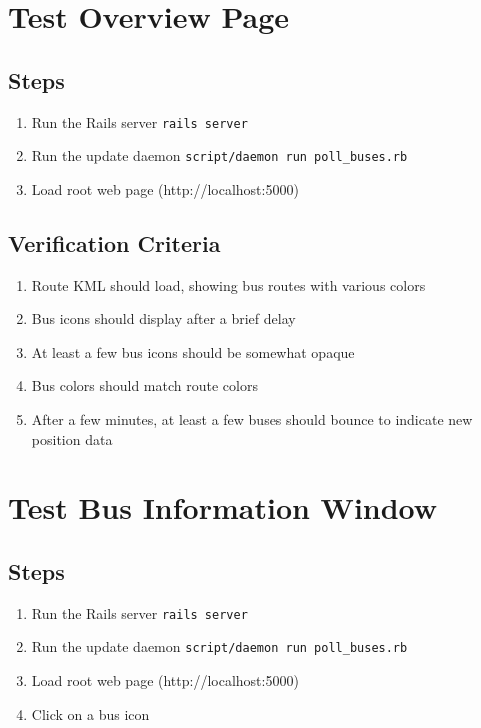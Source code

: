 \documentclass[12pt]{report}
\newcommand{\lstBash}{\lstinline[language=bash,breaklines=true]}
\begin{document}
\section{Test Overview Page}
\subsection*{Steps}
\begin{enumerate}
\item Run the Rails server \lstBash|rails server|
\item Run the update daemon \lstBash|script/daemon run poll_buses.rb|
\item Load root web page (http://localhost:5000)
\end{enumerate}
\subsection*{Verification Criteria}
\begin{enumerate}
\item Route KML should load, showing bus routes with various colors
\item Bus icons should display after a brief delay
\item At least a few bus icons should be somewhat opaque
\item Bus colors should match route colors
\item After a few minutes, at least a few buses should bounce to indicate new position data
\end{enumerate}

\section{Test Bus Information Window}
\subsection*{Steps}
\begin{enumerate}
\item Run the Rails server \lstBash|rails server|
\item Run the update daemon \lstBash|script/daemon run poll_buses.rb|
\item Load root web page (http://localhost:5000)
\item Click on a bus icon
\end{enumerate}
\end{document}
